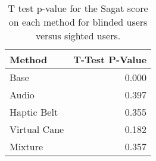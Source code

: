 
\begin{table}[!htb]
\centering
\caption{T test p-value for the Sagat score on each method for blinded users versus sighted users.}
\label{tab:ttest_sagat_score}
\begin{tabular}{lr}
\toprule
      Method &  T-Test P-Value \\
\midrule
        Base &           0.000 \\
       Audio &           0.397 \\
 Haptic Belt &           0.355 \\
Virtual Cane &           0.182 \\
     Mixture &           0.357 \\
\bottomrule
\end{tabular}
\end{table}


